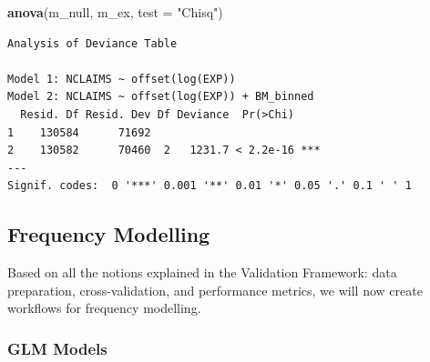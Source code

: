 \documentclass[
  english,
  11pt,
]{article}
\newenvironment{Shaded}{\begin{snugshade}}{\end{snugshade}}
\newcommand{\AttributeTok}[1]{\textcolor[rgb]{0.13,0.29,0.53}{#1}}
\newcommand{\FunctionTok}[1]{\textcolor[rgb]{0.13,0.29,0.53}{\textbf{#1}}}
\newcommand{\NormalTok}[1]{#1}
\newcommand{\StringTok}[1]{\textcolor[rgb]{0.31,0.60,0.02}{#1}}
\begin{document}
\begin{Shaded}
\begin{Highlighting}[]
\FunctionTok{anova}\NormalTok{(m\_null, m\_ex, }\AttributeTok{test =} \StringTok{"Chisq"}\NormalTok{)}
\end{Highlighting}
\end{Shaded}

\begin{verbatim}
Analysis of Deviance Table

Model 1: NCLAIMS ~ offset(log(EXP))
Model 2: NCLAIMS ~ offset(log(EXP)) + BM_binned
  Resid. Df Resid. Dev Df Deviance  Pr(>Chi)    
1    130584      71692                          
2    130582      70460  2   1231.7 < 2.2e-16 ***
---
Signif. codes:  0 '***' 0.001 '**' 0.01 '*' 0.05 '.' 0.1 ' ' 1
\end{verbatim}

\subsection{Frequency Modelling}\label{frequency-modelling}

Based on all the notions explained in the Validation Framework: data
preparation, cross-validation, and performance metrics, we will now
create workflows for frequency modelling.

\subsubsection{GLM Models}\label{glm-models}
\end{document}
